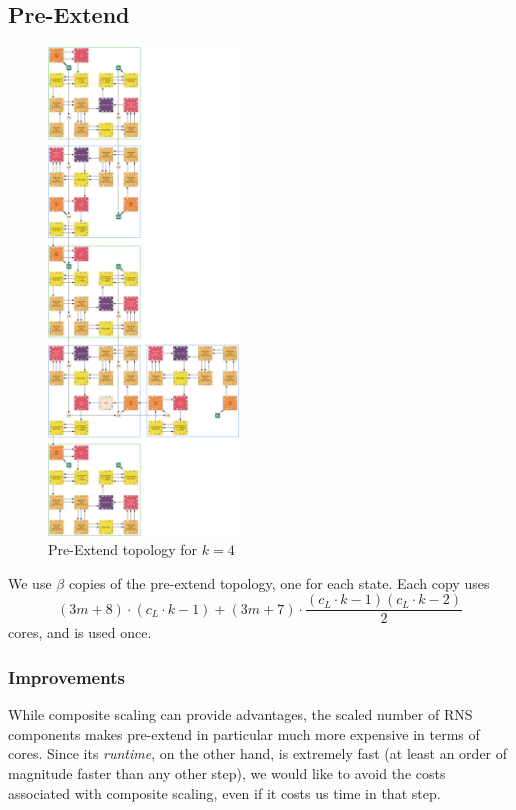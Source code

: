 \documentclass[../../fheimpl.tex]{subfiles}
\begin{document}
\subsection{Pre-Extend}
\begin{figure}
	\includegraphics[width=0.45\textwidth]{graphics/preextend.png}
	\caption{Pre-Extend topology for $k=4$}
	\label{fig:preextendtopo}
\end{figure}
We use $\beta$ copies of the pre-extend topology, one for each state. Each copy uses
\[(3m+8)\cdot(c_L\cdot k-1)+(3m+7)\cdot\frac{(c_L\cdot k-1)(c_L\cdot k-2)}{2}\]
cores, and is used once.

\subsubsection{Improvements}
While composite scaling can provide advantages, the scaled number of RNS components makes pre-extend in particular much more expensive in terms of cores. Since its \emph{runtime}, on the other hand, is extremely fast (at least an order of magnitude faster than any other step), we would like to avoid the costs associated with composite scaling, even if it costs us time in that step.
\end{document}
